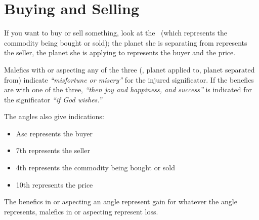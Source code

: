 \section{Buying and Selling}
If  you want to buy or sell something, look at the \Moon\, (which represents the commodity being bought or sold); the planet she is separating from represents the seller, the planet she is applying to represents the buyer and the price.

Malefics  with or aspecting any of the three (\Moon, planet applied to, planet separated from) indicate \textsl{``misfortune or misery''} for the injured significator. If the benefics are with one of the three, \textsl{``then joy and happiness, and success''} is indicated for the significator \textsl{``if God wishes.''}

The  angles also give indications:
\begin{itemize}[topsep=0em,itemsep=0em]
\item{Asc} represents the buyer
\item{7th} represents the seller
\item{4th} represents the commodity being bought or sold
\item{10th} represents the price
\end{itemize}

The benefics in or aspecting an angle represent gain for whatever the angle represents, malefics in or aspecting represent loss.
